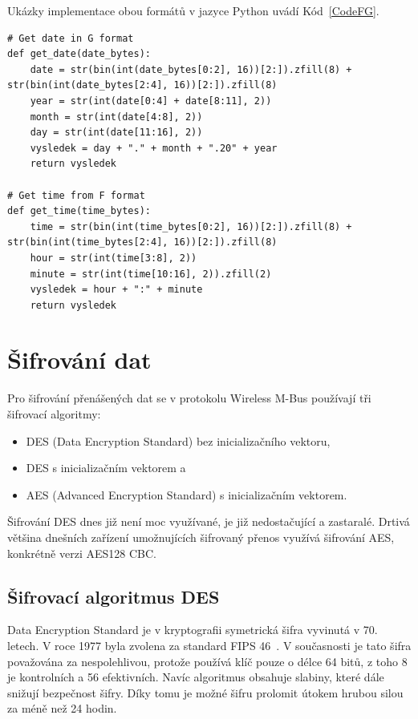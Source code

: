 Ukázky implementace obou formátů v jazyce Python uvádí Kód~\ref{CodeFG}.

\begin{lstlisting}[caption={Implementace F a G formátu},captionpos=b,label=CodeFG,style=MyCodePython]
# Get date in G format
def get_date(date_bytes):
    date = str(bin(int(date_bytes[0:2], 16))[2:]).zfill(8) + str(bin(int(date_bytes[2:4], 16))[2:]).zfill(8)
    year = str(int(date[0:4] + date[8:11], 2))
    month = str(int(date[4:8], 2))
    day = str(int(date[11:16], 2))
    vysledek = day + "." + month + ".20" + year
    return vysledek

# Get time from F format
def get_time(time_bytes):
    time = str(bin(int(time_bytes[0:2], 16))[2:]).zfill(8) + str(bin(int(time_bytes[2:4], 16))[2:]).zfill(8)
    hour = str(int(time[3:8], 2))
    minute = str(int(time[10:16], 2)).zfill(2)
    vysledek = hour + ":" + minute
    return vysledek
\end{lstlisting}
	
\newpage{}	
	
\section{Šifrování dat}
Pro šifrování přenášených dat se v protokolu Wireless M-Bus používají tři šifrovací algoritmy:
\begin{itemize}
	\item DES (Data Encryption Standard) bez inicializačního vektoru,
	\item DES s inicializačním vektorem a
	\item AES (Advanced Encryption Standard) s inicializačním vektorem.
\end{itemize}

Šifrování DES dnes již není moc využívané, je již nedostačující a zastaralé. Drtivá většina dnešních zařízení umožnujících šifrovaný přenos využívá šifrování AES, konkrétně verzi AES128 CBC.

\subsection{Šifrovací algoritmus DES}
Data Encryption Standard je v kryptografii symetrická šifra vyvinutá v 70. letech. V roce 1977 byla zvolena za standard FIPS 46~\cite{NormaFIPS46}. V současnosti je tato šifra považována za nespolehlivou, protože používá klíč pouze o délce 64 bitů, z toho 8 je kontrolních a 56 efektivních. Navíc algoritmus obsahuje slabiny, které dále snižují bezpečnost šifry. Díky tomu je možné šifru prolomit útokem hrubou silou za méně než 24 hodin.

